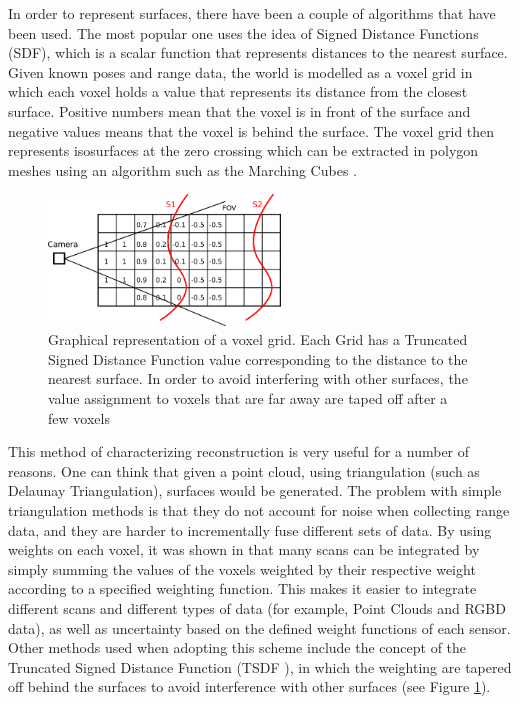 \documentclass[12pt]{article}
\begin{document}
In order to represent surfaces, there have been a couple of algorithms that have been used. The most popular one uses the idea of Signed Distance Functions (SDF), which is a scalar function that represents distances to the nearest surface. Given known poses and range data, the world is modelled as a voxel grid in which each voxel holds  a value that represents its distance from the closest surface. Positive numbers mean that the voxel is in front of the surface and negative values means that the voxel is behind the surface. The voxel grid then represents isosurfaces at the zero crossing which can be extracted in polygon meshes using an algorithm such as the Marching Cubes \cite{marchingcubes}.
	
\begin{figure}
	\centering
	\includegraphics[width=0.55\textwidth]{TSDF}
	\caption[t]{Graphical representation of a voxel grid. Each Grid has a Truncated Signed Distance Function value corresponding to the distance to the nearest surface. In order to avoid interfering with other surfaces, the value assignment to voxels that are far away are taped off after a few voxels}
	\label{fig:TSDF}
\end{figure}

This method of characterizing reconstruction is very useful for a number of reasons. One can think that given a point cloud, using triangulation (such as Delaunay Triangulation), surfaces would be generated. The problem with simple triangulation methods is that they do not account for noise when collecting range data, and they are harder to incrementally fuse different sets of data. By using weights on each voxel, it was shown in \cite{TSDF} that many scans can be integrated by simply summing the values of the voxels weighted by their respective weight according to a specified weighting function. This makes it easier to integrate different scans and different types of data (for example, Point Clouds and RGBD data), as well as uncertainty based on the defined weight functions of each sensor. Other methods used when adopting this scheme include the concept of the Truncated Signed Distance Function (TSDF \cite{TSDF}), in which the weighting are tapered off behind the surfaces to avoid interference with other surfaces (see Figure \ref{fig:TSDF}).
\end{document}
